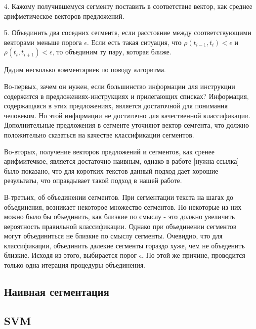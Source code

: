 \documentclass[12pt]{article}
\begin{document}
	4. Кажому получившемуся сегменту поставить в соответствие вектор, как среднее арифметическое векторов предложений.
	
	5. Объединить два соседних сегмента, если расстояние между соответствующими векторами меньше порога $\epsilon$. Если есть такая ситуация, что $\rho(t_{i-1}, t_i)<\epsilon$ и $\rho(t_i, t_{i+1})<\epsilon$, то объединим ту пару, которая ближе.
	
Дадим несколько комментариев по поводу алгоритма.

Во-первых, зачем он нужен, если большинство информации для инструкции содержится в предложениях-инструкциях и прилегающих списках? Информация, содержащаяся в этих предложениях, является достаточной для понимания человеком. Но этой информации не достаточно для качественной классификации. Дополнительные предложения в сегменте уточняют вектор семгента, что должно положительно сказаться на качестве классификации сегментов.

Во-вторых, получение векторов предложений и сегментов, как сренее арифмитечкое, является достаточно наивным, однако в работе [нужна ссылка] было показано, что для коротких текстов данный подход дает хорошие результаты, что оправдывает такой подход в нашей работе.

В-третьих, об объединении сегментов. При сегментации текста на шагах до объединения, возникает некоторое множество сегментов. Но некоторые из них можно было бы объединить, как близкие по смыслу - это должно увеличить вероятность правильной классификации. Однако при объединении сегментов могут объединиться не близкие по смыслу сегменты. Очевидно, что для классификации, объединить далекие сегменты гораздо хуже, чем не объеденить близкие. Исходя из этого, выбирается порог $\epsilon$. По этой же причине, проводится только одна итерация процедуры объединения.

\subsection{Наивная сегментация}

\subsection{SVM}
\end{document}
